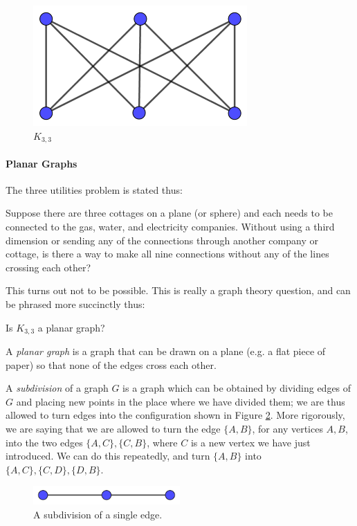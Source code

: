 \documentclass[11pt,a4paper]{report}
\begin{document}
\begin{adjustwidth}{5cm}{5cm}
\begin{figure}[h]
	\centering
	\includegraphics[width=0.5\linewidth]{utilitygraph}
	\caption{\(K_{3,3}\)}
	\label{utilitygraph}
\end{figure}

\paragraph{Planar Graphs}

The three utilities problem is stated thus:

\begin{displayquote}
	Suppose there are three cottages on a plane (or sphere) and each needs to be connected to the gas, water, and electricity companies. Without using a third dimension or sending any of the connections through another company or cottage, is there a way to make all nine connections without any of the lines crossing each other?
\end{displayquote}

This turns out not to be possible. This is really a graph theory question, and can be phrased more succinctly thus:

\begin{displayquote}
	Is \(K_{3,3}\) a planar graph?
\end{displayquote}

A \textit{planar graph} is a graph that can be drawn on a plane (e.g. a flat piece of paper) so that none of the edges cross each other.

A \textit{subdivision} of a graph \(G\) is a graph which can be obtained by dividing edges of \(G\) and placing new points in the place where we have divided them; we are thus allowed to turn edges into the configuration shown in Figure \ref{subdivision}. More rigorously, we are saying that we are allowed to turn the edge \(\{A,B\}\), for any vertices \(A,B\), into the two edges \(\{A,C\},\{C,B\}\), where \(C\) is a new vertex we have just introduced. We can do this repeatedly, and turn \(\{A,B\}\) into \(\{A,C\},\{C,D\},\{D,B\}\).

\begin{figure}[h]
	\centering
	\includegraphics[width=0.5\textwidth]{subdivision}
	\caption{A subdivision of a single edge.}
	\label{subdivision}
\end{figure}


\end{adjustwidth}
\end{document}
